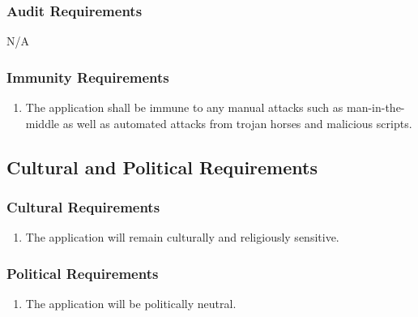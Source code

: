 \documentclass[titlepage]{article}
\newcounter{myCounter}
\begin{document}
\subsubsection{Audit Requirements}
\label{ssub:audit_requirements}
N/A

\subsubsection{Immunity Requirements}
\label{ssub:immunity_requirements}
\begin{enumerate}[{SR}1. ]
    \setcounter{enumi}{\themyCounter}
    \item The application shall be immune to any manual attacks such as man-in-the-middle as well as
    automated attacks from trojan horses and malicious scripts.
    \setcounter{myCounter}{\theenumi}
\end{enumerate}


\subsection{Cultural and Political Requirements}
\label{sub:cultural_and_political_requirements}
\setcounter{myCounter}{0}

\subsubsection{Cultural Requirements}
\label{ssub:cultural_requirements}
\begin{enumerate}[{CP}1. ]
    \setcounter{enumi}{\themyCounter}
    \item The application will remain culturally and religiously sensitive.
    \setcounter{myCounter}{\theenumi}
\end{enumerate}

\subsubsection{Political Requirements}
\label{ssub:political_requirements}
\begin{enumerate}[{CP}1. ]
    \setcounter{enumi}{\themyCounter}
	\item The application will be politically neutral.
    \setcounter{myCounter}{\theenumi}
\end{enumerate}
\end{document}
